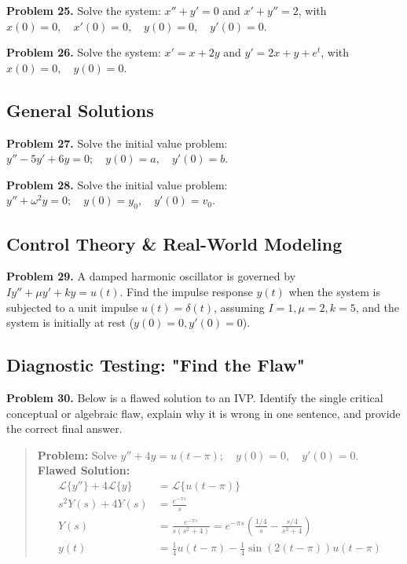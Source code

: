 \documentclass[11pt, letterpaper]{article}
\theoremstyle{definition}
\theoremstyle{remark}
\begin{document}
\textbf{Problem 25.} Solve the system: $x'' + y' = 0$ and $x' + y'' = 2$, with $x(0) = 0, \quad x'(0) = 0, \quad y(0) = 0, \quad y'(0) = 0$.

\textbf{Problem 26.} Solve the system: $x' = x + 2y$ and $y' = 2x + y + e^t$, with $x(0) = 0, \quad y(0) = 0$.

\subsection{General Solutions}
\textbf{Problem 27.} Solve the initial value problem: $y'' - 5y' + 6y = 0; \quad y(0) = a, \quad y'(0) = b$.

\textbf{Problem 28.} Solve the initial value problem: $y'' + \omega^2 y = 0; \quad y(0) = y_0, \quad y'(0) = v_0$.

\subsection{Control Theory \& Real-World Modeling}
\textbf{Problem 29.} A damped harmonic oscillator is governed by $Iy'' + \mu y' + ky = u(t)$. Find the impulse response $y(t)$ when the system is subjected to a unit impulse $u(t) = \delta(t)$, assuming $I=1, \mu=2, k=5$, and the system is initially at rest ($y(0)=0, y'(0)=0$).

\subsection{Diagnostic Testing: "Find the Flaw"}
\textbf{Problem 30.} Below is a flawed solution to an IVP. Identify the single critical conceptual or algebraic flaw, explain why it is wrong in one sentence, and provide the correct final answer.
\begin{quote}
\textbf{Problem:} Solve $y'' + 4y = u(t-\pi); \quad y(0) = 0, \quad y'(0) = 0$. \\
\textbf{Flawed Solution:}
\begin{align*}
\mathcal{L}\{y''\} + 4\mathcal{L}\{y\} &= \mathcal{L}\{u(t-\pi)\} \\
s^2 Y(s) + 4Y(s) &= \frac{e^{-\pi s}}{s} \\
Y(s) &= \frac{e^{-\pi s}}{s(s^2+4)} = e^{-\pi s} \left( \frac{1/4}{s} - \frac{s/4}{s^2+4} \right) \\
y(t) &= \frac{1}{4} u(t-\pi) - \frac{1}{4} \sin(2(t-\pi)) u(t-\pi)
\end{align*}
\end{quote}

\newpage
\end{document}

